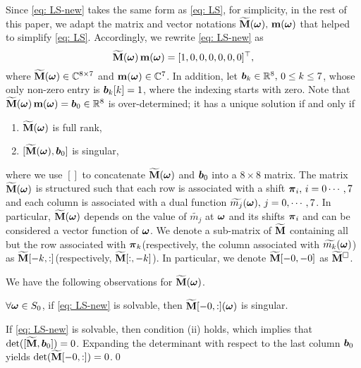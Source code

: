 Since \eqref{eq: LS-new} takes the same form as \eqref{eq: LS}, for simplicity, in the rest of this paper, we adapt the matrix and vector notations $\widetilde{\mathbf{M}}(\boldsymbol{\omega}),\,\mathbf{m}(\boldsymbol{\omega}) $ that helped to simplify \eqref{eq: LS}. Accordingly, we rewrite \eqref{eq: LS-new} as  \[\widetilde{\mathbf{M}}(\boldsymbol{\omega})\, \mathbf{m} (\boldsymbol{\omega})= [1,0,0,0,0,0,0]^\top,\]  where $\widetilde{\mathbf{M}}(\boldsymbol{\omega})\in\mathbb{C}^{8\times 7}$ and $\mathbf{m}(\boldsymbol{\omega})\in\mathbb{C}^7$. In addition, let $\boldsymbol{b}_k \in\mathbb{R}^8,\, 0\leq k\leq 7$, whose only non-zero entry is $\boldsymbol{b}_k[k] = 1$, where the indexing starts with zero. Note that $\widetilde{\mathbf{M}}(\boldsymbol{\omega})\,\mathbf{m}(\boldsymbol{\omega}) = \boldsymbol{b}_0\in\mathbb{R}^8$ is over-determined; it has a unique solution if and only if 

\begin{enumerate}[leftmargin=.5in]
\item[\mylabel{cond: 1}{(\ref{sec: solve-quincunx}.i)}] $\widetilde{\mathbf{M}}(\boldsymbol{\omega})$ is full rank,
\item[\mylabel{cond: 2}{(\ref{sec: solve-quincunx}.ii)}] $[\widetilde{\mathbf{M}}(\boldsymbol{\omega}), \boldsymbol{b}_0]$ is singular,
\end{enumerate}
where we use $[]$ to concatenate $\widetilde{\mathbf{M}}(\boldsymbol{\omega})$ and $\boldsymbol{b}_0$ into a $8\times 8$ matrix. %
The matrix $\widetilde{\mathbf{M}}(\boldsymbol{\omega})$ is structured such that each row is associated with a shift $\boldsymbol{\pi}_i,\,i=0\cdots,7$ and each column is associated with a dual function $\widetilde{m_{j}}(\boldsymbol{\omega}),\,j=0,\cdots,7$. In particular, $\widetilde{\mathbf{M}}(\boldsymbol{\omega})$ depends on the value of $\widetilde{m_j}$ at $\boldsymbol{\omega}$ and its shifts $\boldsymbol{\pi}_i$ and can be considered a vector function of $\boldsymbol{\omega}$. We denote a sub-matrix of $\widetilde{\mathbf{M}}$ containing all but the row associated with $\boldsymbol{\pi}_k$(respectively, the column associated with $\widetilde{m_{k}}(\boldsymbol{\omega})$) as $\widetilde{\mathbf{M}}[-k,:]$(respectively, $\widetilde{\mathbf{M}}[:,-k]$).
In particular, we denote $\widetilde{\mathbf{M}}[-0,-0]$ as $\widetilde{\mathbf{M}}^{\Box}$.

We have the following observations for $\widetilde{\mathbf{M}}(\boldsymbol{\omega})$.
\begin{lemma}\label{lem: subM-singular}
 $\forall \boldsymbol{\omega}\in S_0$, if \eqref{eq: LS-new} is solvable, then $\widetilde{\mathbf{M}}[-0,:](\boldsymbol{\omega})$ is singular.
\end{lemma}
If \eqref{eq: LS-new} is solvable, then condition (ii) holds, which implies that $\det([\widetilde{\mathbf{M}},\boldsymbol{b}_0]) = 0$. Expanding the determinant with respect to the last column $\boldsymbol{b}_0$ yields $\det(\widetilde{\mathbf{M}}[-0,:]) = 0$.\qed


